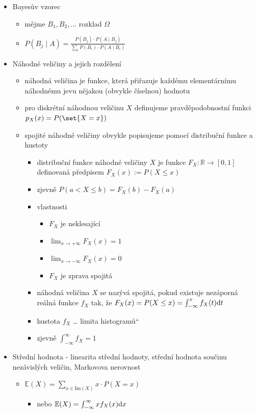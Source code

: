 \begin{itemize}
\item Bayesův vzorec
\begin{itemize}
\item mějme $B_1,B_2,\dots$ rozklad $\Omega$
\item $P(B_j\mid A)=\frac{P(B_j)\cdot P(A\mid B_j)}{\sum_i P(B_i)\cdot P(A\mid B_i)}$
\end{itemize}
\item Náhodné veličiny a jejich rozdělení
\begin{itemize}
\item náhodná veličina je funkce, která přiřazuje každému elementárnímu náhodnému jevu nějakou (obvykle číselnou) hodnotu
\item pro diskrétní náhodnou veličinu $X$ definujeme pravděpodobnostní funkci $p_X(x)=P(\set{X=x})$
\item spojité náhodné veličiny obvykle popisujeme pomocí distribuční funkce a hustoty
\begin{itemize}
\item distribuční funkce náhodné veličiny $X$ je funkce $F_X:\mathbb R\to [0,1]$ definovaná předpisem $F_X(x):=P(X\leq x)$
\item zjevně $P(a\lt X\leq b)=F_X(b)-F_X(a)$
\item vlastnosti
\begin{itemize}
\item $F_X$ je neklesající
\item $\lim_{x\to+\infty} F_X(x)=1$
\item $\lim_{x\to-\infty} F_X(x)=0$
\item $F_X$ je zprava spojitá
\end{itemize}
\item náhodná veličina $X$ se nazývá spojitá, pokud existuje nezáporná reálná funkce $f_X$ tak, že $F_X(x)=P(X\leq x)=\int_{-\infty}^x f_X(t)\text dt$
\item hustota $f_X$ \dots{} \quotedblbase{}limita histogramů\textquotedblleft{}
\item zjevně $\int_{-\infty}^\infty f_X=1$
\end{itemize}
\end{itemize}
\item Střední hodnota - linearita střední hodnoty, střední hodnota součinu nezávislých veličin, Markovova nerovnost
\begin{itemize}
\item $\mathbb E(X)=\sum_{x\in\text{Im}(X)}x\cdot P(X=x)$
\begin{itemize}
\item nebo $\mathbb E(X)=\int_{-\infty}^{\infty} x f_X(x)\text dx$

\end{itemize}
\end{itemize}
\end{itemize}
